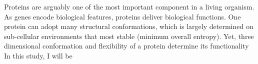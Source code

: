 Proteins are arguably one of the most important component in a living organism. As genes encode biological features, proteins deliver biological functions. One protein can adopt many structural conformations, which is largely determined on sub-cellular environments that most stable (minimum overall entropy). Yet, three dimensional conformation and flexibility of a protein determine its functionality    In this study, I will be 